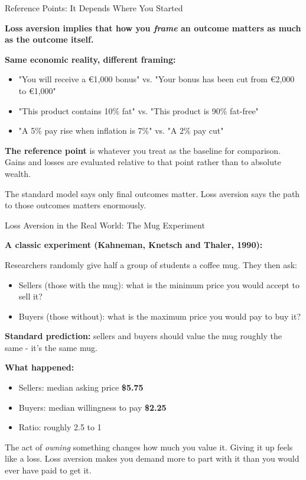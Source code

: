 \documentclass[10pt]{beamer}
\begin{document}
\begin{frame}{Reference Points: It Depends Where You Started}

\textbf{Loss aversion implies that how you \emph{frame} an outcome matters as much as the outcome itself.}


\textbf{Same economic reality, different framing:}

\begin{itemize}
\item "You will receive a \euro 1,000 bonus" vs. "Your bonus has been cut from \euro 2,000 to \euro 1,000"
\item "This product contains 10\% fat" vs. "This product is 90\% fat-free"
\item "A 5\% pay rise when inflation is 7\%" vs. "A 2\% pay cut"
\end{itemize}


\textbf{The reference point} is whatever you treat as the baseline for comparison.
  Gains and losses are evaluated relative to that point rather than to absolute wealth.


\alert{The standard model says only final outcomes matter.}
Loss aversion says the path to those outcomes matters enormously.

\end{frame}


\begin{frame}[allowframebreaks]{Loss Aversion in the Real World: The Mug Experiment}

\textbf{A classic experiment (Kahneman, Knetsch and Thaler, 1990):}


Researchers randomly give half a group of students a coffee mug.
They then ask:
\begin{itemize}
\item Sellers (those with the mug): what is the minimum price you would accept to sell it?
\item Buyers (those without): what is the maximum price you would pay to buy it?
\end{itemize}


\textbf{Standard prediction:} sellers and buyers should value the mug roughly the same - it's the same mug.


\textbf{What happened:}
\begin{itemize}
\item Sellers: median asking price \textbf{\$5.75}
\item Buyers: median willingness to pay \textbf{\$2.25}
\item Ratio: roughly \alert{2.5 to 1}
\end{itemize}


The act of \emph{owning} something changes how much you value it.
Giving it up feels like a loss. Loss aversion makes you demand more to part with it than you would ever have paid to get it.
\end{frame}
\end{document}
